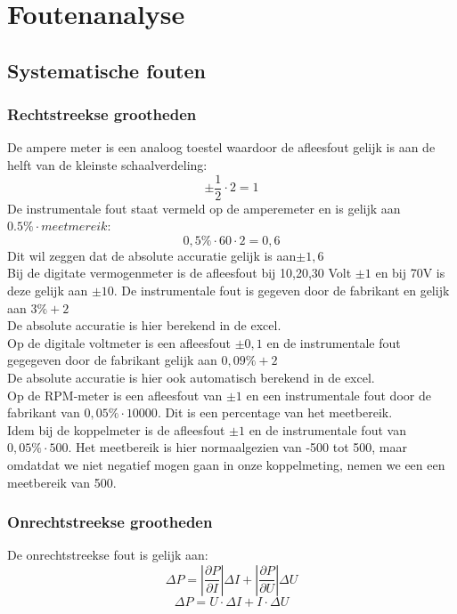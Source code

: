 \section{Foutenanalyse}
\subsection{Systematische fouten}
\subsubsection{Rechtstreekse grootheden}
De ampere meter is een analoog toestel waardoor de afleesfout gelijk is aan de helft van de kleinste schaalverdeling:
$$\pm\frac{1}{2}\cdot 2=1$$ De instrumentale fout staat vermeld op de amperemeter en is gelijk aan $0.5\% \cdot meetmereik$:
$$0,5\% \cdot 60 \cdot 2 = 0,6$$ Dit wil zeggen dat de absolute accuratie gelijk is aan$\pm 1,6$\\


\noindent Bij de digitate vermogenmeter is de afleesfout bij 10,20,30 Volt 
$\pm 1$ en bij 70V is deze gelijk aan $\pm 10$.
De instrumentale fout is gegeven door de fabrikant en gelijk aan $3\% + 2$\\
De absolute accuratie is hier berekend in de excel.\\

\noindent Op de digitale voltmeter is een afleesfout $\pm 0,1$ en de instrumentale fout gegegeven door de 
fabrikant gelijk aan $0,09\% + 2$\\
De absolute accuratie is hier ook automatisch berekend in de excel.\\

\noindent Op de RPM-meter is een afleesfout van $\pm 1$ en een instrumentale fout door de fabrikant van 
$0,05\% \cdot10000$. Dit is een percentage van het meetbereik.\\

\noindent Idem bij de koppelmeter is de afleesfout $\pm 1$ en de instrumentale fout van $0,05\% \cdot 500$.
Het meetbereik is hier normaalgezien van -500 tot 500, maar omdatdat we niet negatief mogen gaan in onze 
koppelmeting, nemen we een een meetbereik van 500.\\

\subsubsection{Onrechtstreekse grootheden}
De onrechtstreekse fout is gelijk aan:
\begin{equation}
    \Delta P = \left| \frac{\partial P}{\partial I}\right| \Delta I + \left| \frac{\partial P}{\partial U}\right| \Delta U
\end{equation}
\begin{equation*}
    \Delta P = U \cdot \Delta  I + I \cdot \Delta U
\end{equation*}
    





